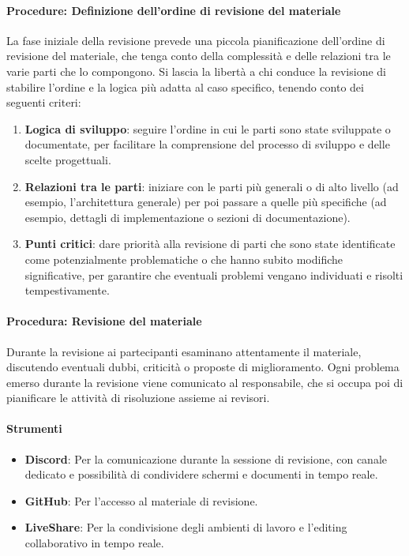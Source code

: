 \documentclass[a4paper,12pt]{article}
\begin{document}
\paragraph{Procedure: Definizione dell'ordine di revisione del materiale}
La fase iniziale della revisione prevede una piccola pianificazione dell'ordine
di revisione del materiale, che tenga conto della complessità e delle relazioni
tra le varie parti che lo compongono. Si lascia la libertà a chi conduce la
revisione di stabilire l'ordine e la logica più adatta al caso specifico,
tenendo conto dei seguenti criteri:
\begin{enumerate}
    \item \textbf{Logica di sviluppo}: seguire l'ordine in cui le parti sono state sviluppate o documentate, per facilitare la comprensione del processo di sviluppo e delle scelte progettuali.
    \item \textbf{Relazioni tra le parti}: iniziare con le parti più generali o di alto livello (ad esempio, l'architettura generale) per poi passare a quelle più specifiche (ad esempio, dettagli di implementazione o sezioni di documentazione).
    \item \textbf{Punti critici}: dare priorità alla revisione di parti che sono state identificate come potenzialmente problematiche o che hanno subito modifiche significative, per garantire che eventuali problemi vengano individuati e risolti tempestivamente.
\end{enumerate}

\paragraph{Procedura: Revisione del materiale}
Durante la revisione ai partecipanti esaminano attentamente il materiale,
discutendo eventuali dubbi, criticità o proposte di miglioramento. Ogni
problema emerso durante la revisione viene comunicato al responsabile, che si
occupa poi di pianificare le attività di risoluzione assieme ai revisori.

\paragraph{Strumenti}
\begin{itemize}
    \item \textbf{Discord}: Per la comunicazione durante la sessione di revisione, con canale dedicato e possibilità di condividere schermi e documenti in tempo reale.
    \item \textbf{GitHub}: Per l'accesso al materiale di revisione.
    \item \textbf{LiveShare}: Per la condivisione degli ambienti di lavoro e l'editing collaborativo in tempo reale.
\end{itemize}
\end{document}

